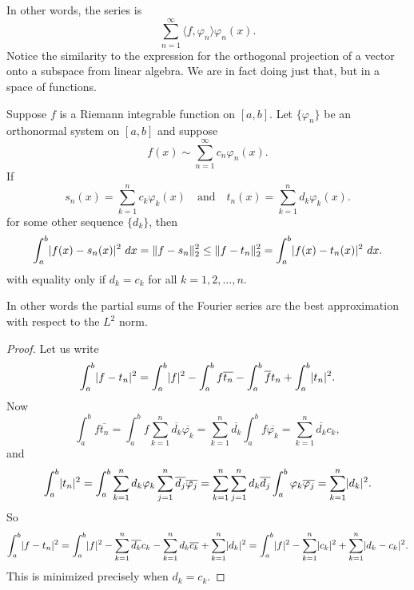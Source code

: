 In other words, the series is
\begin{equation*}
\sum_{n=1}^\infty \langle f , \varphi_n \rangle \varphi_n(x) .
\end{equation*}
Notice the similarity to the expression for the orthogonal
projection of a vector onto a subspace from linear algebra.  We are
in fact doing just that, but in a space of functions.

\begin{thm} \label{thm:l2bestapprox}
Suppose $f$ is a Riemann integrable function on $[a,b]$.
Let $\{ \varphi_n \}$ be an orthonormal system on $[a,b]$ and
suppose
\begin{equation*}
f(x) \sim \sum_{n=1}^\infty c_n \varphi_n(x) .
\end{equation*}
If
\begin{equation*}
s_n (x) = \sum_{k=1}^n c_k \varphi_k(x)
\quad\text{and}\quad
t_n (x) = \sum_{k=1}^n d_k \varphi_k(x) .
\end{equation*}
for some other sequence $\{ d_k \}$, then
\begin{equation*}
\int_a^b \lvert {f(x)-s_n(x)} \rvert^2 ~ dx = \lVert {f-s_n} \rVert_2^2 \leq
\lVert {f-t_n} \rVert_2^2 = \int_a^b \lvert {f(x)-t_n(x)} \rvert^2 ~ dx .
\end{equation*}
with equality only if $d_k = c_k$ for all $k=1,2,\ldots,n$.
\end{thm}

In other words the partial sums of the Fourier series are the best approximation with respect to the
$L^2$ norm.

\begin{proof}
Let us write
\begin{equation*}
\int_a^b \lvert {f-t_n} \rvert^2
=
\int_a^b \lvert {f} \rvert^2
-
\int_a^b f \overline{t_n}
-
\int_a^b \overline{f} t_n
+
\int_a^b \lvert {t_n} \rvert^2 .
\end{equation*}
Now
\begin{equation*}
\int_a^b f \overline{t_n}
=
\int_a^b f \sum_{k=1}^n \overline{d_k} \overline{\varphi_k}
=
 \sum_{k=1}^n \overline{d_k} \int_a^b f \overline{\varphi_k}
=
 \sum_{k=1}^n \overline{d_k} c_k ,
\end{equation*}
and
\begin{equation*}
\int_a^b \lvert {t_n} \rvert^2
=
\int_a^b
\sum_{k=1}^n d_k \varphi_k
\sum_{j=1}^n \overline{d_j} \overline{\varphi_j}
=
\sum_{k=1}^n
\sum_{j=1}^n 
d_k
\overline{d_j} 
\int_a^b
\varphi_k
\overline{\varphi_j}
=
\sum_{k=1}^n
\lvert {d_k} \rvert^2 .
\end{equation*}
So
\begin{equation*}
\int_a^b \lvert {f-t_n} \rvert^2
=
\int_a^b \lvert {f} \rvert^2
-
\sum_{k=1}^n \overline{d_k} c_k
-
\sum_{k=1}^n d_k \overline{c_k}
+
\sum_{k=1}^n
\lvert {d_k} \rvert^2
=
\int_a^b \lvert {f} \rvert^2
-
\sum_{k=1}^n \lvert {c_k} \rvert^2
+
\sum_{k=1}^n
\lvert {d_k-c_k} \rvert^2 .
\end{equation*}
This is minimized precisely when $d_k = c_k$.
\end{proof}

